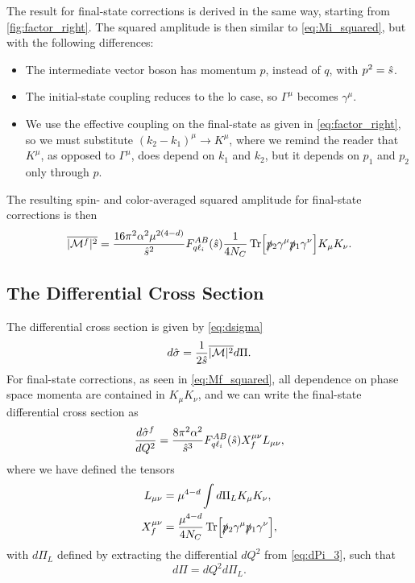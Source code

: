 The result for final-state corrections is derived in the same way, starting from \cref{fig:factor_right}. The squared amplitude is then similar to \cref{eq:Mi_squared}, but with the following differences:
\begin{itemize}
    \item The intermediate vector boson has momentum $p$, instead of $q$, with $p^2=\hat{s}$.
    \item The initial-state coupling reduces to the \gls{lo} case, so $\Gamma^\mu$ becomes $\gamma^\mu$.
    \item We use the effective coupling on the final-state as given in \cref{eq:factor_right}, so we must substitute $(k_2-k_1)^\mu \to K^\mu$, where we remind the reader that $K^\mu$, as opposed to $\Gamma^\mu$, does depend on $k_1$ and $k_2$, but it depends on $p_1$ and $p_2$ only through $p$.
\end{itemize}
The resulting spin- and color-averaged squared amplitude for final-state corrections is then
\begin{equation}
    \overline{|\mathcal{M}^f|^2} = \frac{16\pi^2\alpha^2\mu^{2(4-d)}}{\hat{s}^2}F_{q\ell_i}^{AB}(\hat{s}) \frac{1}{4N_C} \operatorname{Tr}\Bigl[ \slashed{p}{}_2\gamma^\mu\slashed{p}{}_1\gamma^\nu \Bigr] K_\mu K_\nu. \label{eq:Mf_squared}
\end{equation}

\subsection{The Differential Cross Section}
The differential cross section is given by \cref{eq:dsigma}
\begin{equation}
    d\hat{\sigma} = \frac{1}{2\hat{s}} \overline{|\mathcal{M}|^2} d\Pi.
\end{equation}
For final-state corrections, as seen in \cref{eq:Mf_squared}, all dependence on phase space momenta are contained in $K_\mu K_\nu$, and we can write the final-state differential cross section as
\begin{equation}
    \frac{d\hat{\sigma}^f}{dQ^2} = \frac{8\pi^2\alpha^2}{\hat{s}^3} F_{q\ell_i}^{AB}(\hat{s}) 
    X_f^{\mu\nu}
    L_{\mu\nu},
    \label{eq:dsigmaf_LX}
\end{equation}
where we have defined the tensors
\begin{subequations}
\begin{align}
    L_{\mu\nu} &= \mu^{4-d} \int d\Pi_L K_\mu K_\nu,
    \\
    X_f^{\mu\nu} &= \frac{\mu^{4-d}}{4N_C} \operatorname{Tr}\Bigl[ \slashed{p}{}_2\gamma^\mu\slashed{p}{}_1\gamma^\nu \Bigr],
\end{align}
\end{subequations}
with $d\Pi_L$ defined by extracting the differential $dQ^2$ from \cref{eq:dPi_3}, such that
\begin{equation}
    d\Pi = dQ^2 d\Pi_L.
    \label{eq:dPi_L_def}
\end{equation}

